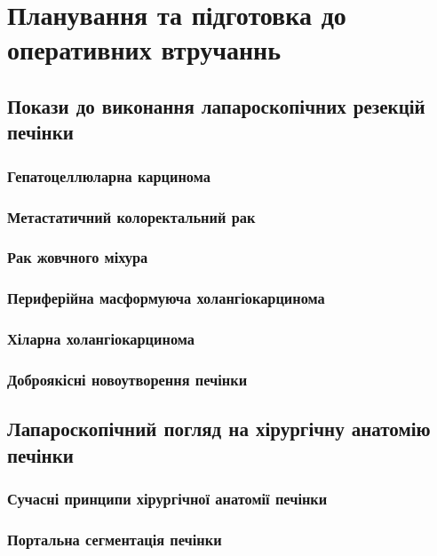 \chapter{Планування та підготовка до оперативних втручаннь}
\begin{refsection}
\section{Покази до виконання лапароскопічних резекцій печінки}

\subsection{Гепатоцеллюларна карцинома}

\subsection{Метастатичний колоректальний рак}

\subsection{Рак жовчного міхура}

\subsection{Периферійна масформуюча холангіокарцинома}

\subsection{Хіларна холангіокарцинома}

\subsection{Доброякісні новоутворення печінки}

\section{Лапароскопічний погляд на хірургічну анатомію печінки}

\subsection{Сучасні принципи хірургічної анатомії печінки}

\subsection{Портальна сегментація печінки}


\end{refsection}

